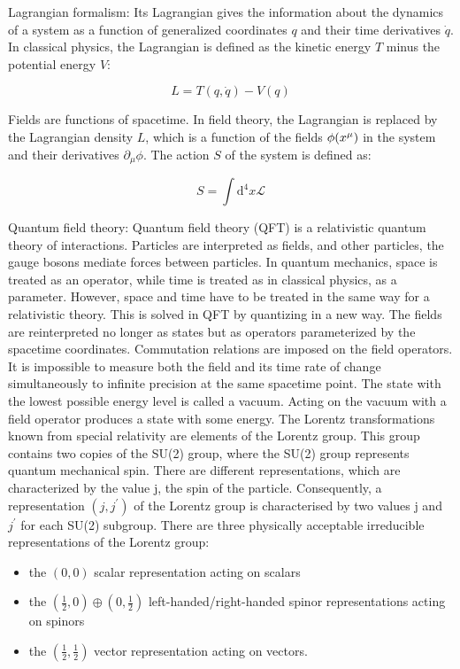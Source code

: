 Lagrangian formalism: Its Lagrangian gives the information about the dynamics of a system as a function of generalized coordinates $q$ and their time derivatives $\dot{q}$. In classical physics, the Lagrangian is defined as the kinetic energy $T$ minus the potential energy $V$:

\begin{equation}
  L=T(q, \dot{q})-V(q)
\end{equation}

Fields are functions of spacetime. In field theory, the Lagrangian is replaced by the Lagrangian density $L$, which is a function of the fields $\phi(x^{\mu})$ in the system and their derivatives $\partial_{\mu} \phi$. The action $S$ of the system is defined as:

\begin{equation}
  S=\int \mathrm{d}^{4} x \mathcal{L}
\end{equation}

Quantum field theory: Quantum field theory (QFT) is a relativistic quantum theory of interactions. Particles are interpreted as fields, and other particles, the gauge bosons mediate forces between particles. In quantum mechanics, space is treated as an operator, while time is treated as in classical physics, as a parameter. However, space and time have to be treated in the same way for a relativistic theory. This is solved in QFT by quantizing in a new way. The fields are reinterpreted no longer as states but as operators parameterized by the spacetime coordinates. Commutation relations are imposed on the field operators. It is impossible to measure both the field and its time rate of change simultaneously to infinite precision at the same spacetime point. The state with the lowest possible energy level is called a vacuum. Acting on the vacuum with a field operator produces a state with some energy. The Lorentz transformations known from special relativity are elements of the Lorentz group. This group contains two copies of the SU(2) group, where the SU(2) group represents quantum mechanical spin. There are different representations, which are characterized by the value j, the spin of the particle. Consequently, a representation $(j, j^{\prime})$ of the Lorentz group is characterised by two values j and $j^{\prime}$ for each SU(2) subgroup. There are three physically acceptable irreducible representations of the Lorentz group:
\begin{itemize}
\item the $(0, 0 )$ scalar representation acting on scalars
\item the $(\frac{1}{2}, 0) \oplus(0, \frac{1}{2} )$ left-handed/right-handed spinor representations acting on spinors
\item the $(\frac{1}{2}, \frac{1}{2} )$ vector representation acting on vectors.
\end{itemize}

